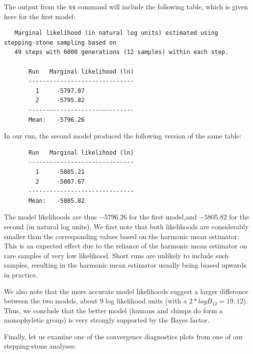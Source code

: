 \documentclass[12pt]{book}
\newcommand{\ttt}[1]{\texttt{#1}}
\begin{document}
The output from the \ttt{ss} command will include the following table, which is given here for the
first model:

\scriptsize
\begin{singlespacing}
\begin{verbatim}
   Marginal likelihood (in natural log units) estimated using stepping-stone sampling based on
   49 steps with 6000 generations (12 samples) within each step. 

       Run   Marginal likelihood (ln)
       ------------------------------
         1     -5797.07   
         2     -5795.82   
       ------------------------------
       Mean:   -5796.26
\end{verbatim}
\end{singlespacing}
\normalsize

In our run, the second model produced the following version of the same table:

\scriptsize
\begin{singlespacing}
\begin{verbatim}
       Run   Marginal likelihood (ln)
       ------------------------------
         1     -5805.21   
         2     -5807.67   
       ------------------------------
       Mean:   -5805.82
\end{verbatim}
\end{singlespacing}
\normalsize

The model likelihoods are thus $-5796.26$ for the first model,and $-5805.82$ for the second (in
natural log units). We first note that both likelihoods are considerably smaller than the
corresponding values based on the harmonic mean estimator. This is an expected effect due to the
reliance of the harmonic mean estimator on rare samples of very low likelihood. Short runs are
unlikely to include such samples, resulting in the harmonic mean estimator usually being biased
upwards in practice.

We also note that the more accurate model likelihoods suggest a larger difference between the two
models, about 9 log likelihood units (with a $2*logB_{12} = 19,12$). Thus, we conclude that the
better model (humans and chimps do form a monophyletic group) is very strongly supported by the
Bayes factor.

Finally, let us examine one of the convergence diagnostics plots from one of our stepping-stone
analyses:
\end{document}
